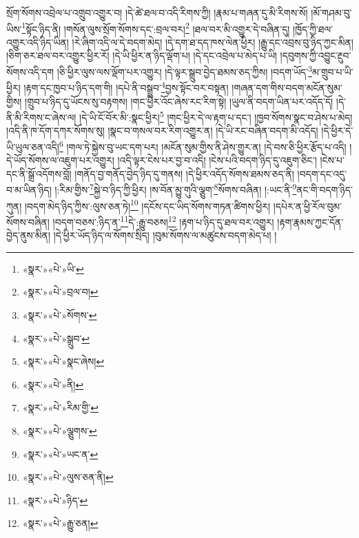སྲོག་སོགས་འབྲེལ་པ་འགྲུབ་འགྱུར་བ། །དེ་ཚེ་ཐལ་བ་འདི་རིགས་ཀྱི། །རྣམ་པ་གཞན་དུ་མི་རིགས་སོ། །མོ་གཤམ་བུ་ཡིས་\footnote{«སྣར་»«པེ་»ཡི་}སྟོང་ཉིད་ནི། །གསོན་ལུས་སྲོག་སོགས་དང་:བྲལ་བར།\footnote{«སྣར་»«པེ་»བྲལ་བ།} །ཐལ་བར་མི་འགྱུར་དེ་བཞིན་དུ། །ཁྱོད་ཀྱི་ཐལ་འགྱུར་འདི་ཉིད་ཡིན། །རེ་ཞིག་འདི་ལ་དེ་བདག་མེད། །དེ་དག་ཐ་དད་ཁས་ལེན་ཕྱིར། །རྒྱུ་དང་འབྲས་བུ་ཉིད་ཀྱང་མིན། །ཅིག་ཅར་ཐལ་བར་འགྱུར་ཕྱིར་རོ། །དེ་ཡི་ཕྱིར་ན་ཉིད་ལྡོག་པ། །དེ་དང་འབྲེལ་པ་མེད་པ་ཡི། །དབུགས་ཀྱི་འབྱུང་རྔུབ་སོགས་འདི་དག །ཅི་ཕྱིར་ལུས་ལས་ལྡོག་པར་འགྱུར། །དེ་ལྟར་སྒྲུབ་བྱེད་ཐམས་ཅད་ཀྱིས། །བདག་ཡོད་\footnote{«སྣར་»«པེ་»སོགས་}མ་གྲུབ་པ་ཡི་ཕྱིར། །རྟག་དང་ཁྱབ་པ་ཉིད་དག་གི། །དཔེ་ནི་བསྒྲུབ་\footnote{«སྣར་»«པེ་»སྒྲུབ་}བྱས་སྟོང་བར་བསྟན། །གཞན་དག་གིས་བདག་མངོན་སུམ་གྱིས། །གྲུབ་པ་ཉིད་དུ་ཡོངས་སུ་བརྟགས། །གང་ཕྱིར་འོང་ཞེས་རང་རིག་སྟེ། །ཡུལ་ནི་བདག་ཡིན་པར་འདོད་དོ། །དེ་ནི་མི་རིགས་ང་ཞེས་ལ། །དེ་ཡི་ངོ་བོར་མི་:སྣང་ཕྱིར།\footnote{«སྣར་»«པེ་»སྣང་ཞེས།} །གང་ཕྱིར་དེ་ལ་རྟག་པ་དང་། །ཁྱབ་སོགས་སྣང་བ་ཤེས་པ་མེད། །འདི་ནི་ཁ་དོག་དཀར་སོགས་སུ། །སྣང་བ་གསལ་བར་རིག་འགྱུར་ན། །དེ་ཡི་རང་བཞིན་བདག་མི་འདོད། །དེ་ཕྱིར་དེ་ཡི་ཡུལ་ཅན་འདི།\footnote{«སྣར་»«པེ་»ནི།} །གལ་ཏེ་སྐྱེས་བུ་ཡང་དག་པར། །མངོན་སུམ་གྱིས་ནི་ཤེས་གྱུར་ན། །དེ་བས་ཅི་ཕྱིར་རྩོད་པ་འདི། །དེ་ཡོད་སོགས་ལ་འཇུག་པར་འགྱུར། །འདི་ལྟར་ངེས་པར་བྱ་བ་འདི། །ངེས་པའི་བདག་ཉིད་དུ་འཇུག་ཅིང་། །ངེས་པ་དང་ནི་སྒྲོ་འདོགས་བློ། །གནོད་བྱ་གནོད་བྱེད་ཉིད་དུ་གནས། །དེ་ཕྱིར་འདོད་སོགས་ཐམས་ཅད་ནི། །བདག་དང་འདུ་བ་མ་ཡིན་ཉིད། །:རིམ་གྱིས་\footnote{«སྣར་»«པེ་»རིམ་གྱི་}སྐྱེ་བ་ཉིད་ཀྱི་ཕྱིར། །ས་བོན་མྱུ་གུའི་ལྕུག་\footnote{«སྣར་»«པེ་»ལྕུགས་}སོགས་བཞིན། །:ཡང་ནི་\footnote{«སྣར་»«པེ་»ཡང་ན་}ནང་གི་བདག་ཉིད་ཀུན། །བདག་མེད་ཉིད་ཀྱིས་:ལུས་ཅན་ཏེ།\footnote{«སྣར་»«པེ་»ལུས་ཅན་ནི།} །དངོས་དང་ཡིད་སོགས་གཏན་ཚིགས་ཕྱིར། །དཔེར་ན་ཕྱི་རོལ་བུམ་སོགས་བཞིན། །བདག་བཅས་:ཉིད་ན་\footnote{«སྣར་»«པེ་»ཉིད་}དེ་:རྒྱུ་བཅས།\footnote{«སྣར་»«པེ་»རྒྱུ་ཅན།} །རྟག་པ་ཉིད་དུ་ཐལ་བར་འགྱུར། །རྟག་རྣམས་ཀྱང་དོན་བྱེད་ནུས་མིན། །དེ་ཕྱིར་ཡོད་ཉིད་ལ་སོགས་སྲིད། །བུམ་སོགས་ལ་མཚུངས་བདག་མེད་པ། །
